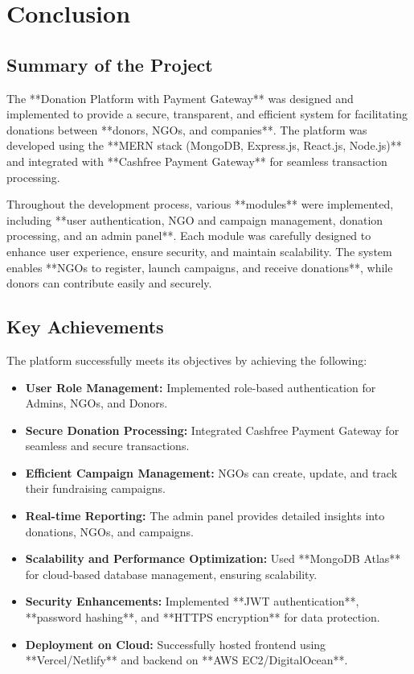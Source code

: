 \chapter{Conclusion}

\section{Summary of the Project}
The **Donation Platform with Payment Gateway** was designed and implemented to provide a secure, transparent, and efficient system for facilitating donations between **donors, NGOs, and companies**. The platform was developed using the **MERN stack (MongoDB, Express.js, React.js, Node.js)** and integrated with **Cashfree Payment Gateway** for seamless transaction processing. 

Throughout the development process, various **modules** were implemented, including **user authentication, NGO and campaign management, donation processing, and an admin panel**. Each module was carefully designed to enhance user experience, ensure security, and maintain scalability. The system enables **NGOs to register, launch campaigns, and receive donations**, while donors can contribute easily and securely.

\section{Key Achievements}
The platform successfully meets its objectives by achieving the following:
\begin{itemize}
    \item \textbf{User Role Management:} Implemented role-based authentication for Admins, NGOs, and Donors.
    \item \textbf{Secure Donation Processing:} Integrated Cashfree Payment Gateway for seamless and secure transactions.
    \item \textbf{Efficient Campaign Management:} NGOs can create, update, and track their fundraising campaigns.
    \item \textbf{Real-time Reporting:} The admin panel provides detailed insights into donations, NGOs, and campaigns.
    \item \textbf{Scalability and Performance Optimization:} Used **MongoDB Atlas** for cloud-based database management, ensuring scalability.
    \item \textbf{Security Enhancements:} Implemented **JWT authentication**, **password hashing**, and **HTTPS encryption** for data protection.
    \item \textbf{Deployment on Cloud:} Successfully hosted frontend using **Vercel/Netlify** and backend on **AWS EC2/DigitalOcean**.
\end{itemize}

